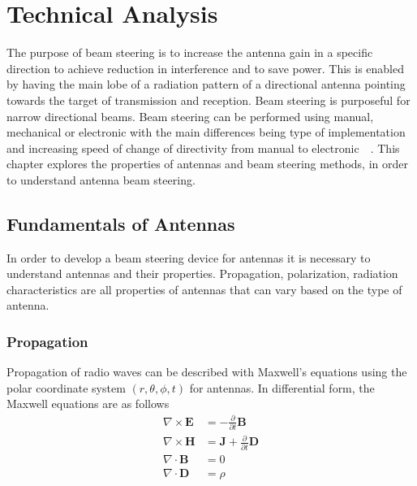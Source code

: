 \chapter{Technical Analysis}
The purpose of beam steering is to increase the antenna gain in a specific direction to achieve reduction in interference and to save power. This is enabled by having the main lobe of a radiation pattern of a directional antenna pointing towards the target of transmission and reception. Beam steering is purposeful for narrow directional beams. Beam steering can be performed using manual, mechanical or electronic with the main differences being type of implementation and increasing speed of change of directivity from manual to electronic~\cite{ieee_beam_steering}~\cite{ieee_microchip_beam_steering}. This chapter explores the properties of antennas and beam steering methods, in order to understand antenna beam steering.

\section{Fundamentals of Antennas}
In order to develop a beam steering device for antennas it is necessary to understand antennas and their properties. Propagation, polarization, radiation characteristics are all properties of antennas that can vary based on the type of antenna.

\subsection{Propagation}
Propagation of radio waves can be described with Maxwell's equations using the polar coordinate system $\left( r, \theta, \phi, t \right)$ for antennas. In differential form, the Maxwell equations are as follows
\begin{equation}
    \begin{split}
        \nabla \times \textbf{E} & = - \frac{\partial }{\partial t} \textbf{B} \\
        \nabla \times \textbf{H} & = \textbf{J} + \frac{\partial }{\partial t} \textbf{D} \\
        \nabla \cdot \textbf{B} & = 0 \\
        \nabla \cdot \textbf{D} & = \rho
    \end{split}
\end{equation}

